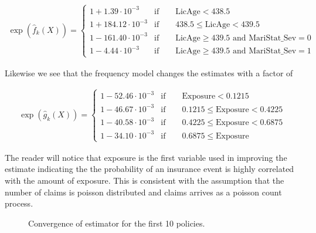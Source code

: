 \documentclass[
]{article}
\begin{document}
\begin{align*}
\exp(\hat f_k(X))=\begin{cases}
  1+1.39\cdot 10^{-3} & \text{if}\qquad  \text{LicAge}<438.5\\
  1+184.12\cdot 10^{-3} & \text{if}\qquad  438.5\le \text{LicAge}<439.5\\
  1-161.40\cdot 10^{-3} & \text{if}\qquad  \text{LicAge}\ge 439.5\text{ and MariStat\_Sev}=0\\
  1-4.44\cdot 10^{-3} & \text{if}\qquad \text{LicAge}\ge 439.5\text{ and MariStat\_Sev}=1
\end{cases}
\end{align*}

Likewise we see that the frequency model changes the estimates with a
factor of

\begin{align*}
\exp(\hat g_k(X))=\begin{cases}
  1-52.46\cdot 10^{-3} & \text{if}\qquad  \text{Exposure}<0.1215\\
  1-46.67\cdot 10^{-3} & \text{if}\qquad 0.1215\le \text{Exposure}<0.4225\\
  1-40.58\cdot 10^{-3} & \text{if}\qquad  0.4225\le \text{Exposure}<0.6875\\
  1-34.10\cdot 10^{-3} & \text{if}\qquad  0.6875\le \text{Exposure}
\end{cases}
\end{align*}

The reader will notice that exposure is the first variable used in
improving the estimate indicating the the probability of an insurance
event is highly correlated with the amount of exposure. This is
consistent with the assumption that the number of claims is poisson
distributed and claims arrives as a poisson count process.

\begin{figure}[h]
    \centering
    \qquad
    \caption{Convergence of estimator for the first 10 policies.}
\end{figure}
\end{document}
